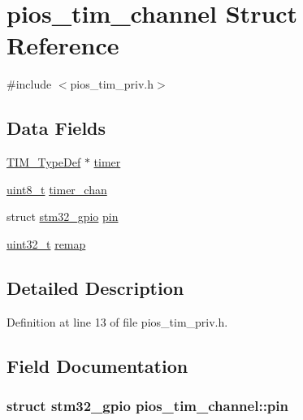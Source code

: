 \hypertarget{structpios__tim__channel}{\section{pios\-\_\-tim\-\_\-channel Struct Reference}
\label{structpios__tim__channel}
}


{\ttfamily \#include $<$pios\-\_\-tim\-\_\-priv.\-h$>$}

\subsection*{Data Fields}
\begin{DoxyCompactItemize}
\item 
\hyperlink{struct_t_i_m___type_def}{T\-I\-M\-\_\-\-Type\-Def} $\ast$ \hyperlink{structpios__tim__channel_a07d1ffb5da40643ef9938fa9c4fad017}{timer}
\item 
\hyperlink{stdint_8h_aba7bc1797add20fe3efdf37ced1182c5}{uint8\-\_\-t} \hyperlink{structpios__tim__channel_a66cede40f7ef0785c0941c49ea162b59}{timer\-\_\-chan}
\item 
struct \hyperlink{structstm32__gpio}{stm32\-\_\-gpio} \hyperlink{structpios__tim__channel_a6500258c79aaab18cc524727753e388e}{pin}
\item 
\hyperlink{stdint_8h_a435d1572bf3f880d55459d9805097f62}{uint32\-\_\-t} \hyperlink{structpios__tim__channel_ac0c7199f77fa4e99068cda8572e02064}{remap}
\end{DoxyCompactItemize}


\subsection{Detailed Description}


Definition at line 13 of file pios\-\_\-tim\-\_\-priv.\-h.



\subsection{Field Documentation}
\hypertarget{structpios__tim__channel_a6500258c79aaab18cc524727753e388e}{
\subsubsection[{pin}]{\setlength{\rightskip}{0pt plus 5cm}struct {\bf stm32\-\_\-gpio} pios\-\_\-tim\-\_\-channel\-::pin}}\label{structpios__tim__channel_a6500258c79aaab18cc524727753e388e}


